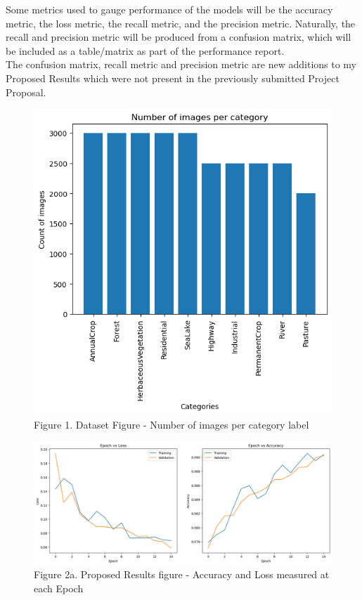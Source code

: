 \documentclass[acmtog]{acmart}
\begin{document}
	Some metrics used to gauge performance of the models will be the accuracy metric, the loss metric, the recall metric, and the precision metric. Naturally, the recall and precision metric will be produced from a confusion matrix, which will be included as a table/matrix as part of the performance report.\\
	The confusion matrix, recall metric and precision metric are new additions to my Proposed Results which were not present in the previously submitted Project Proposal.


	\begin{figure}[h]
		\centering
		\includegraphics[scale=0.7]{src/images/Fig1.png}\\
		Figure 1. Dataset Figure - Number of images per category label
		
		\vspace{2cm}
		
		\centering
		\includegraphics[scale=0.5]{src/images/Fig3.png}\\
		Figure 2a. Proposed Results figure - Accuracy and Loss measured at each Epoch
	\end{figure}
	
\end{document}
